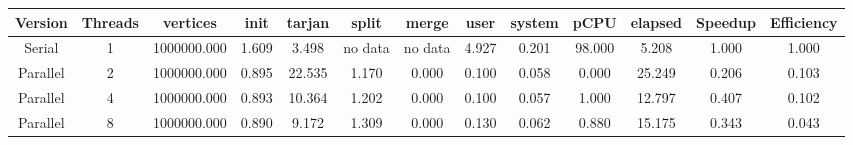 \begin{tabular}{|c|c|c|c|c|c|c|c|c|c|c|c|c|}
\toprule
 Version &  Threads &    vertices &  init &  tarjan &   split &   merge &  user &  system &   pCPU &  elapsed &  Speedup &  Efficiency \\
\midrule
  Serial &        1 & 1000000.000 & 1.609 &   3.498 & no data & no data & 4.927 &   0.201 & 98.000 &    5.208 &    1.000 &       1.000 \\
Parallel &        2 & 1000000.000 & 0.895 &  22.535 &   1.170 &   0.000 & 0.100 &   0.058 &  0.000 &   25.249 &    0.206 &       0.103 \\
Parallel &        4 & 1000000.000 & 0.893 &  10.364 &   1.202 &   0.000 & 0.100 &   0.057 &  1.000 &   12.797 &    0.407 &       0.102 \\
Parallel &        8 & 1000000.000 & 0.890 &   9.172 &   1.309 &   0.000 & 0.130 &   0.062 &  0.880 &   15.175 &    0.343 &       0.043 \\
\bottomrule
\end{tabular}
